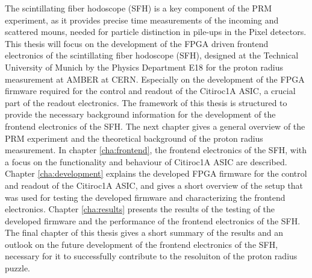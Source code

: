\newline
The scintillating fiber hodoscope (SFH) is a key component of the PRM experiment, as it provides precise time measurements of the incoming and scattered mouns,
needed for particle distinction in pile-ups in the Pixel detectors\Autocite{InternalcommunicationIgor}.
\newline
This thesis will focus on the development of the FPGA driven frontend electronics of the scintillating fiber hodoscope (SFH),
designed at the Technical University of Munich by the Physics Department E18 for the proton radius measurement at AMBER at CERN.
Especially on the development of the FPGA firmware required for the control and readout of the Citiroc1A ASIC,
a crucial part of the readout electronics.
\newline 
The framework of this thesis is structured to provide the necessary background information for the development of the frontend electronics of the SFH.
\newline
The next chapter gives a general overview of the PRM experiment and the theoretical background of the proton radius measurement.
\newline 
In chapter \ref{cha:frontend}, the frontend electronics of the SFH, with a focus on the functionality and behaviour of Citiroc1A ASIC are described.
\newline
Chapter \ref{cha:development} explains the developed FPGA firmware for the control and readout of the Citiroc1A ASIC, and gives a short overview of the setup that was used for testing the developed firmware and characterizing the frontend electronics.
\newline
Chapter \ref{cha:results} presents the results of the testing of the developed firmware and the performance of the frontend electronics of the SFH.
\newline 
The final chapter of this thesis gives a short summary of the results and an outlook on the future development of the frontend electronics of the SFH,
necessary for it to successfully contribute to the resoluiton of the proton radius puzzle.



 

